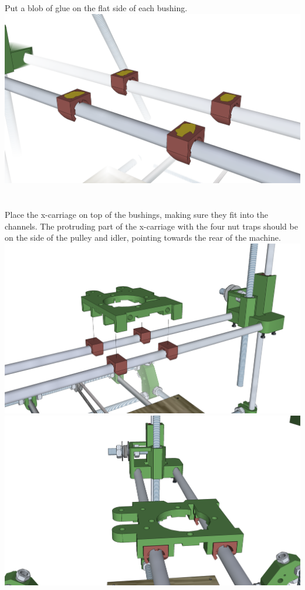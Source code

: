 \documentclass[twoside,a4paper,titlepage]{memoir}
\begin{document}
	\section{}
	Put a blob of glue on the flat side of each bushing.\\
	\includegraphics[width=1\linewidth]{graphics/ch9_8.png}
	
	\section{}
	Place the x-carriage on top of the bushings, making sure they fit into the channels. The protruding part
	of the x-carriage with the four nut traps should be on the side of the pulley and idler, pointing towards
	the rear of the machine.\\
	\includegraphics[width=1\linewidth]{graphics/ch9_9_1.png}
	\includegraphics[width=1\linewidth]{graphics/ch9_9_2.png}
	
\end{document}
